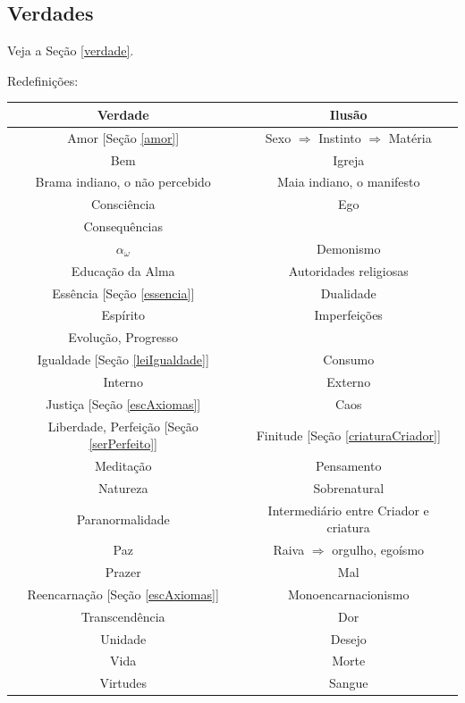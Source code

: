 \documentclass[12pt,a4paper]{article}
\begin{document}
		\subsection{Verdades}
			\begin{flushright}
			\end{flushright}

			Veja a Se\c{c}\~ao \ref{verdade}.

			Redefini\c{c}\~oes:

			\begin{center}
				\begin{tabular}{|c|c|}
					\hline
					Verdade & Ilus\~ao \\
					\hline
					Amor [Se\c{c}\~ao \ref{amor}] & Sexo $ \Rightarrow $ Instinto $ \Rightarrow $ Mat\'eria \\
					Bem & Igreja\cite{igreja} \\
					Brama indiano, o n\~ao percebido & Maia indiano, o manifesto \\
					Consci\^encia & Ego \\
					Consequ\^encias &  \\
					$ \alpha_\omega $ & Demonismo\cite{demomono} \\
					Educa\c{c}\~ao da Alma & Autoridades religiosas \\
					Ess\^encia [Se\c{c}\~ao \ref{essencia}] & Dualidade \\
					Esp\'irito & Imperfei\c{c}\~oes \\
					Evolu\c{c}\~ao, Progresso & \\
					Igualdade [Se\c{c}\~ao \ref{leiIgualdade}] & Consumo \\
					Interno & Externo\\
					Justi\c{c}a [Se\c{c}\~ao \ref{escAxiomas}] & Caos \\
					Liberdade\cite{liberdade}, Perfei\c{c}\~ao [Se\c{c}\~ao \ref{serPerfeito}] & Finitude [Se\c{c}\~ao \ref{criaturaCriador}] \\
					Medita\c{c}\~ao & Pensamento \\
					Natureza & Sobrenatural \\
					Paranormalidade & Intermedi\'ario entre Criador e criatura \\
					Paz & Raiva\cite{bomCombate} $ \Rightarrow $ orgulho, ego\'ismo \\
					Prazer & Mal \\
					Reencarna\c{c}\~ao [Se\c{c}\~ao \ref{escAxiomas}] & Monoencarnacionismo\cite{demomono} \\
					Transcend\^encia & Dor \\
					Unidade \cite{unidade} & Desejo \cite{desejo} \\
					Vida & Morte \\
					Virtudes & Sangue \\
					\hline
				\end{tabular}
			\end{center}
\end{document}
